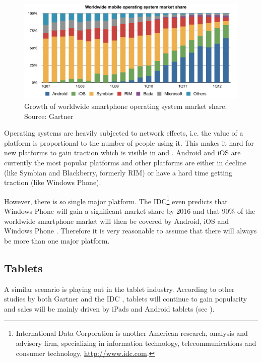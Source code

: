 \begin{figure}[h!]
    \begin{center}
        \includegraphics[width=\textwidth]{figs/smartphone_os.pdf}
        \caption{
            Growth of worldwide smartphone operating system market share.\newline 
            Source: Gartner \citeGartner
        	}
        \label{fig:smartphone-share}
    \end{center}
\end{figure}

Operating systems are heavily subjected to network effects, i.e. the value of a platform is proportional to the number of people using it. This makes it hard for new platforms to gain traction which is visible in  and . Android and iOS are currently the most popular platforms and other platforms are either in decline (like Symbian and Blackberry, formerly RIM) or have a hard time getting traction (like Windows Phone).

However, there is so single major platform. The IDC\footnote{International Data Corporation is another American research, analysis and advisory firm, specializing in information technology, telecommunications and consumer technology, \url{http://www.idc.com}.} even predicts that Windows Phone will gain a significant market share by 2016 and that 90\% of the worldwide smartphone market will then be covered by Android, iOS and Windows Phone \cite{IDC:phone}. Therefore it is very reasonable to assume that there will always be more than one major platform.

\subsection{Tablets}

A similar scenario is playing out in the tablet industry. According to other studies by both Gartner \citep{Gartner:11tab,Gartner:12tab} and the IDC \citep{IDC:tablet}, tablets will continue to gain popularity and sales will be mainly driven by iPads and Android tablets (see ).

